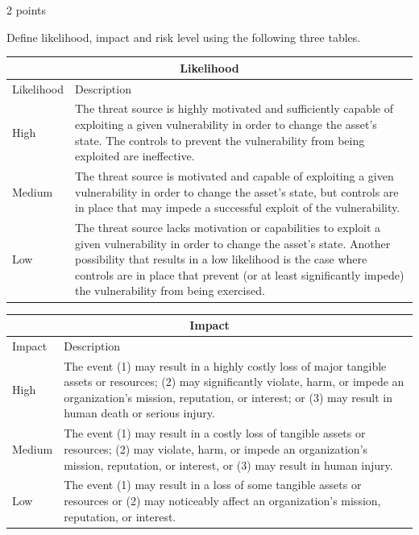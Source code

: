 \documentclass[english]{article}
\begin{document}
2 points

Define likelihood, impact and risk level using the following three
  tables.


\begin{center}
\begin{table}[h]
\begin{tabularx}{\textwidth}{|l|X|}
\hline
\multicolumn{2}{|c|}{\bf Likelihood} \\
\hline
Likelihood & Description \\
\hline
\hline
High & The threat source is highly motivated and sufficiently capable of exploiting a given vulnerability in order to change the asset’s state. The controls to prevent the vulnerability from being exploited are ineffective.\\
\hline
Medium & The threat source is motivated and capable of exploiting a given vulnerability in order to change the asset’s state, but controls are in place that may impede a successful exploit of the vulnerability. \\
\hline
Low   & The threat source lacks motivation or capabilities to exploit a given vulnerability in order to change the asset’s state. Another possibility that results in a low likelihood is the case where controls are in place that prevent (or at least significantly impede) the vulnerability from being exercised. \\
\hline
\end{tabularx}
\end{table}
\hspace{3em}
\begin{table}[h]
\begin{tabularx}{\textwidth}{|l|X|}
\hline
\multicolumn{2}{|c|}{\bf Impact} \\
\hline
Impact & Description \\
\hline
\hline
High   & The event (1) may result in a highly costly loss of major tangible assets or resources; (2) may significantly violate, harm, or impede an organization’s mission, reputation, or interest; or (3) may result in human death or serious injury. \\
\hline
Medium & The event (1) may result in a costly loss of tangible assets or resources; (2) may violate, harm, or impede an organization’s mission, reputation, or interest, or (3) may result in human injury.\\
\hline
Low & The event (1) may result in a loss of some tangible assets or resources or (2) may noticeably affect an organization’s mission, reputation, or interest.\\
\hline
\end{tabularx}
\end{table}
\end{center}
\end{document}
